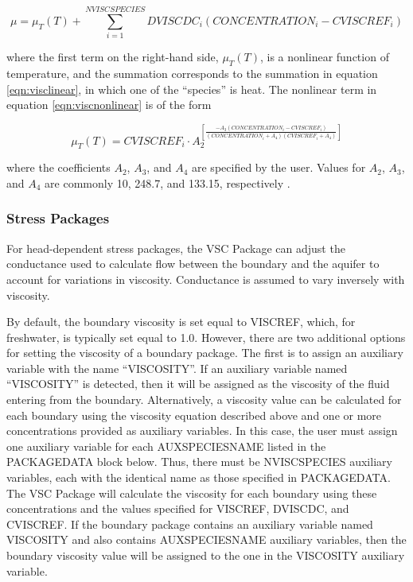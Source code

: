 \begin{equation}
\label{eqn:viscnonlinear}
\mu = \mu_T(T) + \sum_{i=1}^{NVISCSPECIES} DVISCDC_i \left ( CONCENTRATION_i - CVISCREF_i \right )
\end{equation}

\noindent where the first term on the right-hand side, $\mu_T(T)$, is a nonlinear function of temperature, and the summation corresponds to the summation in equation \ref{eqn:visclinear}, in which one of the ``species'' is heat. The nonlinear term in equation \ref{eqn:viscnonlinear} is of the form

\begin{equation}
\label{eqn:munonlinear}
\mu_T(T) = CVISCREF_i \cdot A_2^{\left [ \frac {-A_3 \left ( CONCENTRATION_i - CVISCREF_i \right ) } {\left ( CONCENTRATION_i + A_4 \right ) \left ( CVISCREF_i + A_4 \right )} \right ]}
\end{equation}

\noindent where the coefficients $A_2$, $A_3$, and $A_4$ are specified by the user.  Values for $A_2$, $A_3$, and $A_4$ are commonly 10, 248.7, and 133.15, respectively  \citep{langevin2008seawat, Voss1984sutra}.
 
\subsubsection{Stress Packages}

For head-dependent stress packages, the VSC Package can adjust the conductance used to calculate flow between the boundary and the aquifer to account for variations in viscosity. Conductance is assumed to vary inversely with viscosity.

By default, the boundary viscosity is set equal to VISCREF, which, for freshwater, is typically set equal to 1.0. However, there are two additional options for setting the viscosity of a boundary package.  The first is to assign an auxiliary variable with the name ``VISCOSITY''.  If an auxiliary variable named ``VISCOSITY'' is detected, then it will be assigned as the viscosity of the fluid entering from the boundary.  Alternatively, a viscosity value can be calculated for each boundary using the viscosity equation described above and one or more concentrations provided as auxiliary variables.  In this case, the user must assign one auxiliary variable for each AUXSPECIESNAME listed in the PACKAGEDATA block below.  Thus, there must be NVISCSPECIES auxiliary variables, each with the identical name as those specified in PACKAGEDATA.  The VSC Package will calculate the viscosity for each boundary using these concentrations and the values specified for VISCREF, DVISCDC, and CVISCREF.  If the boundary package contains an auxiliary variable named VISCOSITY and also contains AUXSPECIESNAME auxiliary variables, then the boundary viscosity value will be assigned to the one in the VISCOSITY auxiliary variable.

